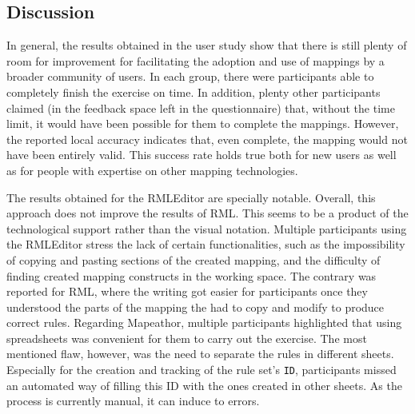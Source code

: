 








\subsection{Discussion}
\label{sec:chp5_mapeathor_discussion}

In general, the results obtained in the user study show that there is still plenty of room for improvement for facilitating the adoption and use of mappings by a broader community of users. In each group, there were participants able to completely finish the exercise on time. In addition, plenty other participants claimed (in the feedback space left in the questionnaire) that, without the time limit, it would have been possible for them to complete the mappings. However, the reported local accuracy indicates that, even complete, the mapping would not have been entirely valid. This success rate holds true both for new users as well as for people with expertise on other mapping technologies. 

The results obtained for the RMLEditor are specially notable. 
Overall, this approach does not improve the results of RML. 
This seems to be a product of the technological support rather than the visual notation. 
Multiple participants using the RMLEditor stress the lack of certain functionalities, such as the impossibility of copying and pasting sections of the created mapping, and the difficulty of finding created mapping constructs in the working space. 
The contrary was reported for RML, where the writing got easier for participants once they understood the parts of the mapping the had to copy and modify to produce correct rules.
Regarding Mapeathor, multiple participants highlighted that using spreadsheets was convenient for them to carry out the exercise. 
The most mentioned flaw, however, was the need to separate the rules in different sheets. 
Especially for the creation and tracking of the rule set's \texttt{ID}, participants missed an automated way of filling this ID with the ones created in other sheets. 
As the process is currently manual, it can induce to errors.

